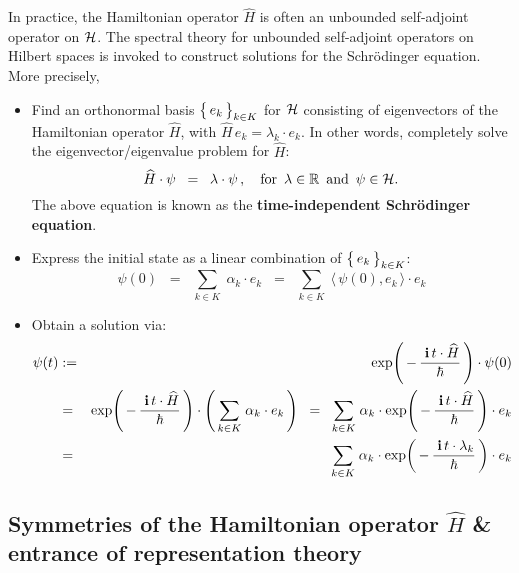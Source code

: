 In practice, the Hamiltonian operator $\widehat{H}$ is often an unbounded self-adjoint operator on $\mathcal{H}$.
The spectral theory for {\color{red}unbounded self-adjoint} operators on Hilbert spaces is invoked to construct solutions
for the Schr\"{o}dinger equation.
More precisely,
\begin{itemize}
\item
	Find an orthonormal basis
	$\left\{\,\overset{{\color{white}.}}{e_{k}}\,\right\}_{k \in K}$
	for $\mathcal{H}$ consisting of eigenvectors of the Hamiltonian operator $\widehat{H}$,
	with $\widehat{H}\,e_{k} = \lambda_{k}\cdot e_{k}$.
	In other words, completely solve the eigenvector/eigenvalue problem for $\widehat{H}$:
	\begin{equation*}
	\widehat{H}\cdot\psi \;\; = \;\; \lambda\cdot\psi\,,
	\quad
	\textnormal{for \,$\lambda \in \mathbb{R}$\, and \,$\psi \in \mathcal{H}$}.
	\end{equation*}
	The above equation is known as the \textbf{time-independent Schr\"{o}dinger equation}.
\item
	Express the initial state as a linear combination of 
	$\left\{\,\overset{{\color{white}.}}{e_{k}}\,\right\}_{k \in K}$:
	\begin{equation*}
	\psi(0)
	\;\; = \;\;
		\underset{k \in K}{\sum}\;\alpha_{k}\cdot e_{k}
	\;\; = \;\;
		\underset{k \in K}{\sum}\;\langle\,\psi(0),e_{k}\,\rangle\cdot e_{k}
	\end{equation*}
\item
	Obtain a solution via:
	\begin{eqnarray*}
	\psi(t)
	& := &
		\exp\!\left(\,-\,\dfrac{{\color{white}.}\i\,t\cdot\widehat{H}}{\hbar}\,\right)\cdot \psi(0)
	\\
	& = &
		\exp\!\left(\,-\,\dfrac{{\color{white}.}\i\,t\cdot\widehat{H}}{\hbar}\,\right)\cdot
		\left(\,\underset{k \in K}{\sum}\;\alpha_{k}\cdot e_{k}\,\right)
	\;\; = \;\;
		\underset{k \in K}{\sum}\;
		\alpha_{k}\cdot 
		\exp\!\left(\,-\,\dfrac{{\color{white}.}\i\,t\cdot\widehat{H}}{\hbar}\,\right)\cdot e_{k}
	\\
	& = &
		\underset{k \in K}{\sum}\;
		\alpha_{k}\cdot 
		\exp\!\left(\,-\,\dfrac{{\color{white}.}\i\,t\cdot\lambda_{k}}{\hbar}\,\right)\cdot e_{k}
	\end{eqnarray*}
\end{itemize}


\vskip 0.5cm
\subsection{Symmetries of the Hamiltonian operator $\widehat{H}$ \& entrance of representation theory}

